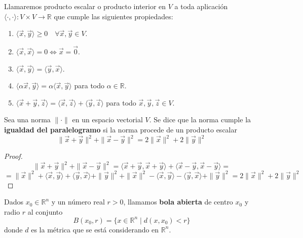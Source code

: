 \begin{definición}
    Llamaremos producto escalar o producto interior en $V$ a toda aplicación $\langle \cdot, \cdot \rangle: V \times V \to \mathbb{R}$ que cumple las siguientes propiedades:
    \begin{enumerate}
        \item $\langle \vec{x}, \vec{y} \rangle \geq 0 \quad \forall \vec{x}, \vec{y} \in V$.
        \item $\langle \vec{x}, \vec{x} \rangle = 0 \Leftrightarrow \vec{x} = \vec{0}$.
        \item $\langle \vec{x}, \vec{y} \rangle = \langle \vec{y}, \vec{x} \rangle$.
        \item $\langle \alpha \vec{x}, \vec{y} \rangle = \alpha \langle \vec{x}, \vec{y} \rangle$ para todo $\alpha \in \mathbb{R}$.
        \item $\langle \vec{x} + \vec{y}, \vec{z} \rangle = \langle \vec{x}, \vec{z} \rangle + \langle \vec{y}, \vec{z} \rangle$ para todo $\vec{x}, \vec{y}, \vec{z} \in V$.
    \end{enumerate}
\end{definición}

\begin{definición}
    Sea una norma $\|\cdot\|$ en un espacio vectorial $V$. Se dice que la norma cumple la \textbf{igualdad del paralelogramo} si la norma procede de un producto escalar
    $$\|\vec{x} + \vec{y}\|^2 + \|\vec{x} - \vec{y}\|^2 = 2\|\vec{x}\|^2 + 2\|\vec{y}\|^2$$
\end{definición}
\begin{proof}
    $$\|\vec{x} + \vec{y}\|^2 + \|\vec{x} - \vec{y}\|^2 = \langle \vec{x} + \vec{y}, \vec{x} + \vec{y} \rangle + \langle \vec{x} - \vec{y}, \vec{x} - \vec{y} \rangle = $$
    $$ = \|\vec{x}\|^2 + \langle \vec{x}, \vec{y} \rangle + \langle \vec{y}, \vec{x} \rangle + \|\vec{y}\|^2 + \|\vec{x}\|^2 - \langle \vec{x}, \vec{y} \rangle - \langle \vec{y}, \vec{x} \rangle + \|\vec{y}\|^2 = 2\|\vec{x}\|^2 + 2\|\vec{y}\|^2$$
\end{proof}

\begin{definición}
    Dados $x_0 \in \mathbb{R}^n$ y un número real $r > 0$, llamamos \textbf{bola abierta} de centro $x_0$ y radio $r$ al conjunto
    $$B(x_0, r) = \{x \in \mathbb{R}^n \mid d(x, x_0) < r\}$$
    donde $d$ es la métrica que se está considerando en $\mathbb{R}^n$.
\end{definición}

